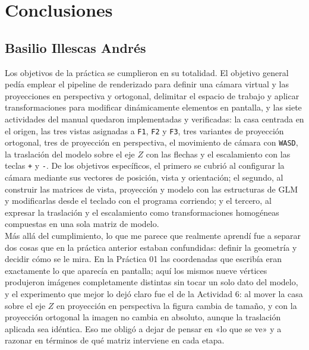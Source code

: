 \section{Conclusiones}
        
    \subsection{Basilio Illescas Andrés}
    Los objetivos de la práctica se cumplieron en su totalidad. El objetivo general pedía emplear el pipeline de renderizado para definir una cámara virtual y las proyecciones en perspectiva y ortogonal, delimitar el espacio de trabajo y aplicar transformaciones para modificar dinámicamente elementos en pantalla, y las siete actividades del manual quedaron implementadas y verificadas: la casa centrada en el origen, las tres vistas asignadas a \texttt{F1}, \texttt{F2} y \texttt{F3}, tres variantes de proyección ortogonal, tres de proyección en perspectiva, el movimiento de cámara con \texttt{WASD}, la traslación del modelo sobre el eje $Z$ con las flechas y el escalamiento con las teclas \texttt{+} y \texttt{-}. De los objetivos específicos, el primero se cubrió al configurar la cámara mediante sus vectores de posición, vista y orientación; el segundo, al construir las matrices de vista, proyección y modelo con las estructuras de GLM y modificarlas desde el teclado con el programa corriendo; y el tercero, al expresar la traslación y el escalamiento como transformaciones homogéneas compuestas en una sola matriz de modelo.\\

    Más allá del cumplimiento, lo que me parece que realmente aprendí fue a separar dos cosas que en la práctica anterior estaban confundidas: definir la geometría y decidir cómo se le mira. En la Práctica 01 las coordenadas que escribía eran exactamente lo que aparecía en pantalla; aquí los mismos nueve vértices produjeron imágenes completamente distintas sin tocar un solo dato del modelo, y el experimento que mejor lo dejó claro fue el de la Actividad 6: al mover la casa sobre el eje $Z$ en proyección en perspectiva la figura cambia de tamaño, y con la proyección ortogonal la imagen no cambia en absoluto, aunque la traslación aplicada sea idéntica. Eso me obligó a dejar de pensar en «lo que se ve» y a razonar en términos de qué matriz interviene en cada etapa.\\


